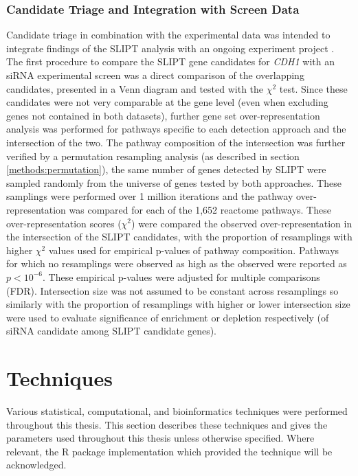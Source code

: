 \subsubsection{Candidate Triage and Integration with Screen Data} \label{methods:venn_analysis}
Candidate triage in combination with the experimental data was intended to integrate findings of the SLIPT analysis with an ongoing experiment project \citep{Chen2014, Telford2015}. The first procedure to compare the SLIPT gene candidates for \textit{CDH1} with an siRNA experimental screen \citep{Telford2015} was a direct comparison of the overlapping candidates, presented in a Venn diagram and tested with the $\chi^2$ test. Since these candidates were not very comparable at the gene level (even when excluding genes not contained in both datasets), further gene set over-representation analysis was performed for pathways specific to each detection approach and the intersection of the two. The pathway composition of the intersection was further verified by a permutation resampling analysis (as described in section \ref{methods:permutation}), the same number of genes detected by SLIPT were sampled randomly from the universe of genes tested by both approaches. These samplings were performed over 1 million iterations and the pathway over-representation was compared for each of the 1,652 reactome pathways.
These over-representation scores ($\chi^2$) were compared the observed over-representation in the intersection of the SLIPT candidates, with the proportion of resamplings with higher $\chi^2$ values used for empirical p-values of pathway composition. Pathways for which no resamplings were observed as high as the observed were reported as $p < 10^{-6}$. These empirical p-values were adjusted for multiple comparisons (FDR). Intersection size was not assumed to be constant across resamplings so similarly with the proportion of resamplings with higher or lower intersection size were used to evaluate significance of enrichment or depletion respectively (of siRNA candidate among SLIPT candidate genes).  

\section{Techniques}
Various statistical, computational, and bioinformatics techniques were performed throughout this thesis. This section describes these techniques and gives the parameters used throughout this thesis unless otherwise specified. Where relevant, the R package implementation which provided the technique will be acknowledged. 

